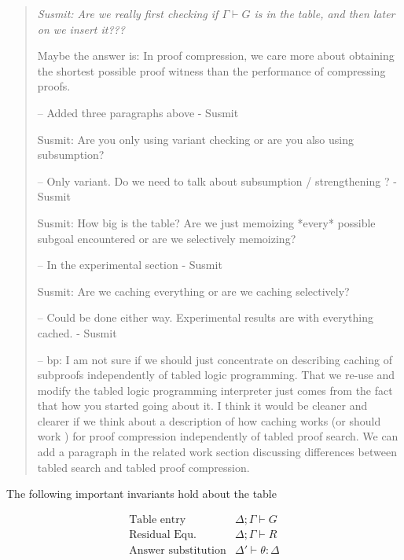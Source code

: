 \documentclass{acmconf}
\newcommand{\vd}{\vdash}
\newenvironment{note}{\begin{quote}\message{note!}\it}{\end{quote}}
\begin{document}
\begin{note}
  Susmit: Are we really first checking if $\Gamma \vd G$ is in the
  table, and then later on we insert it???
  
   Maybe the answer is: In proof compression, we care more about
   obtaining the shortest possible proof witness than the performance
   of compressing proofs. 

-- Added three paragraphs above - Susmit

  Susmit: Are you only using variant checking or are you also using
  subsumption?

-- Only variant. Do we need to talk about subsumption / strengthening ? - Susmit

  Susmit: How big is the table? Are we just memoizing *every* possible
  subgoal encountered or are we selectively memoizing?

-- In the experimental section - Susmit

  Susmit: Are we caching everything or are we caching selectively?

-- Could be done either way. Experimental results are with everything
cached. - Susmit

-- bp: I am not sure if we should just concentrate on describing
caching of subproofs independently of tabled logic programming. That
we re-use and modify the tabled logic programming interpreter just
comes from the fact that how you started going about it. I think it
would be cleaner and clearer if we think about a description of how
caching works (or should work ) for proof compression independently of
tabled proof search. We can add a paragraph in the related work
section discussing differences between tabled search and tabled proof
compression. 
\end{note}

The following important invariants hold about the table

\[
\begin{array}{ll}
\mbox{Table entry} & \Delta ; \Gamma \vd G\\
\mbox{Residual Equ.} & \Delta ; \Gamma \vd R \\
\mbox{Answer substitution} & \Delta' \vd \theta : \Delta
\end{array}
\]
\end{document}
